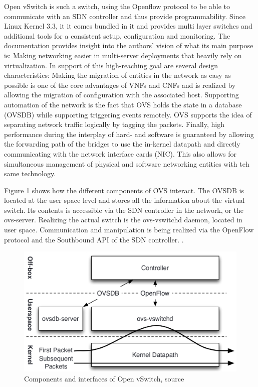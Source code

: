 Open vSwitch is such a switch, using the Openflow protocol to be able to communicate with an SDN controller and thus provide programmability. Since Linux Kernel 3.3, it it comes bundled in it and provides multi layer switches and additional tools for a consistent setup, configuration and monitoring. The documentation provides insight into the authors' vision of what its main purpose is: Making networking easier in multi-server deployments that heavily rely on virtualization. In support of this high-reaching goal are several design characteristics: Making the migration of entities in the network as easy as possible is one of the core advantages of VNFs and CNFs and is realized by allowing the migration of configuration with the associated host. Supporting automation of the network is the fact that OVS holds the state in a database (OVSDB) while supporting triggering events remotely. OVS supports the idea of separating network traffic logically by tagging the packets. Finally, high performance during the interplay of hard- and software is guaranteed by allowing the forwarding path of the bridges to use the in-kernel datapath and directly communicating with the network interface cards (NIC). This also allows for simultaneous management of physical and software networking entities with teh same technology. 

Figure \ref{img:ovs} shows how the different components of OVS interact. The OVSDB is located at the user space level and stores all the information about the virtual switch. Its contents is accessible via the SDN controller in the network, or the ovs-server.
Realizing the actual switch is the ovs-vswitchd daemon, located in user space. Communication and manipulation is being realized via the OpenFlow protocol and the Southbound API of the SDN controller. 
\cite{openvswitch} \cite{pfaff2015design}. 

\begin{figure}[h]
	\centering
	\includegraphics[width=1\linewidth]{images/openvswitch.png}
	\caption{Components and interfaces of Open vSwitch, source \cite{pfaff2015design}}
	\label{img:ovs}
\end{figure}

